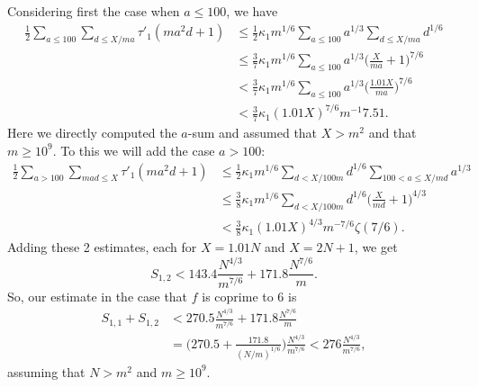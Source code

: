 \documentclass[12pt]{amsart}
\theoremstyle{definition}
\theoremstyle{remark}
\numberwithin{equation}{section}
\begin{document}
Considering first the case when $a\le100$, we have
\begin{align*}
\frac12\sum_{a\le100}\sum_{d\le X/ma}\tau'_1(ma^2d+1)&\le
\frac12\kappa_1 m^{1/6}\sum_{a\le100}a^{1/3}\sum_{d\le X/ma}d^{1/6}\\
&\le \frac37 \kappa_1 m^{1/6}\sum_{a\le100} a^{1/3}\Big(\frac{X}{ma}+1\Big)^{7/6}\\
&<\frac37\kappa_1 m^{1/6}\sum_{a\le100}a^{1/3}\Big(\frac{1.01X}{ma}\Big)^{7/6}\\
&<\frac37\kappa_1 (1.01X)^{7/6}m^{-1}7.51.
\end{align*}
Here we directly computed the $a$-sum and assumed that $X>m^2$ and that $m\ge10^9$.  To this we will add the case $a>100$:
\begin{align*}
\frac12\sum_{a>100}\sum_{mad\le X}\tau'_1(ma^2d+1)&\le
\frac12\kappa_1 m^{1/6}\sum_{d<X/100m}d^{1/6}\sum_{100<a\le X/md}a^{1/3}\\
&\le\frac38\kappa_1 m^{1/6}\sum_{d<X/100m}d^{1/6}\Big(\frac{X}{md}+1\Big)^{4/3}\\
&<\frac38\kappa_1 (1.01X)^{4/3}m^{-7/6}\zeta(7/6).
\end{align*}
Adding these 2 estimates, each for $X=1.01N$ and $X=2N+1$, we get
\[
S_{1,2}<143.4\frac{N^{4/3}}{m^{7/6}}+171.8\frac{N^{7/6}}m.
\]
So, our estimate in the case that $f$ is coprime to 6 is
\begin{align*}
S_{1,1}+S_{1,2}&<270.5\frac{N^{4/3}}{m^{7/6}}+171.8\frac{N^{7/6}}m\\
&=\Big(270.5+\frac{171.8}{(N/m)^{1/6}}\Big)\frac{N^{4/3}}{m^{7/6}}
<276\frac{N^{4/3}}{m^{7/6}},
\end{align*}
assuming that $N>m^2$ and $m\ge10^9$.
\end{document}
